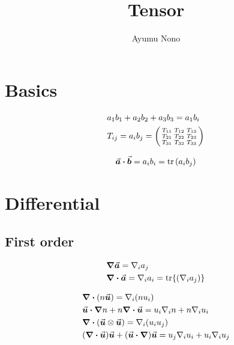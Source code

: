 \documentclass[dvipdfmx,autodetect-engine]{article}
\title{Tensor}
\author{Ayumu Nono}
\begin{document}
\maketitle


\section{Basics}

\begin{align}
    &a_1 b_1 + a_2 b_2 + a_3 b_3 = a_1 b_i \\
    &T_{i j} = a_i b_j = \smqty(\xmat*{T}{3}{3}) 
\end{align}


\begin{align}
    &\va*{a} \vdot \va*{b} =  a_i b_i  = \tr \pqty{a_i b_j} \\
\end{align}

\section{Differential}
\subsection{First order}
\begin{align}
    &\grad \va*{a} = \nabla_i a_j \\
    &\div \va*{a} = \nabla_i a_i = \tr{\pqty{ \nabla_i a_j }}
\end{align}

\begin{align}
    &\div \pqty{n \va*{u}} = \nabla_i \pqty{n u_i} \\
    &\va*{u} \vdot \grad n + n \div \va*{u} = u_i \nabla_i n + n \nabla_i u_i \\
    &\div \pqty{\va*{u} \otimes \va*{u}} = \nabla_i \pqty{u_i u_j} \\
    &\pqty{\div \va*{u}} \va*{u} + \pqty{\va*{u} \vdot \grad} \va*{u} = u_j \nabla_i u_i + u_i \nabla_i u_j\\
\end{align}

\end{document}
